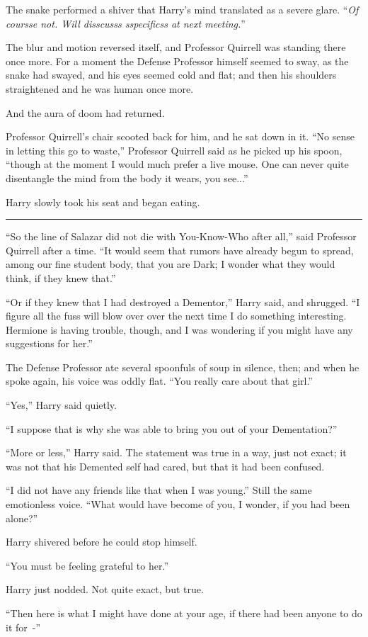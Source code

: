 The snake performed a shiver that Harry's mind translated as a severe glare. ``\emph{Of coursse not. Will disscusss sspecificss at next meeting.}''

The blur and motion reversed itself, and Professor Quirrell was standing there once more. For a moment the Defense Professor himself seemed to sway, as the snake had swayed, and his eyes seemed cold and flat; and then his shoulders straightened and he was human once more.

And the aura of doom had returned.

Professor Quirrell's chair scooted back for him, and he sat down in it. ``No sense in letting this go to waste,'' Professor Quirrell said as he picked up his spoon, ``though at the moment I would much prefer a live mouse. One can never quite disentangle the mind from the body it wears, you see...''

Harry slowly took his seat and began eating.

\begin{center}\rule{3in}{0.4pt}\end{center}

``So the line of Salazar did not die with You-Know-Who after all,'' said Professor Quirrell after a time. ``It would seem that rumors have already begun to spread, among our fine student body, that you are Dark; I wonder what they would think, if they knew that.''

``Or if they knew that I had destroyed a Dementor,'' Harry said, and shrugged. ``I figure all the fuss will blow over over the next time I do something interesting. Hermione is having trouble, though, and I was wondering if you might have any suggestions for her.''

The Defense Professor ate several spoonfuls of soup in silence, then; and when he spoke again, his voice was oddly flat. ``You really care about that girl.''

``Yes,'' Harry said quietly.

``I suppose that is why she was able to bring you out of your Dementation?''

``More or less,'' Harry said. The statement was true in a way, just not exact; it was not that his Demented self had cared, but that it had been confused.

``I did not have any friends like that when I was young.'' Still the same emotionless voice. ``What would have become of you, I wonder, if you had been alone?''

Harry shivered before he could stop himself.

``You must be feeling grateful to her.''

Harry just nodded. Not quite exact, but true.

``Then here is what I might have done at your age, if there had been anyone to do it for~-''
